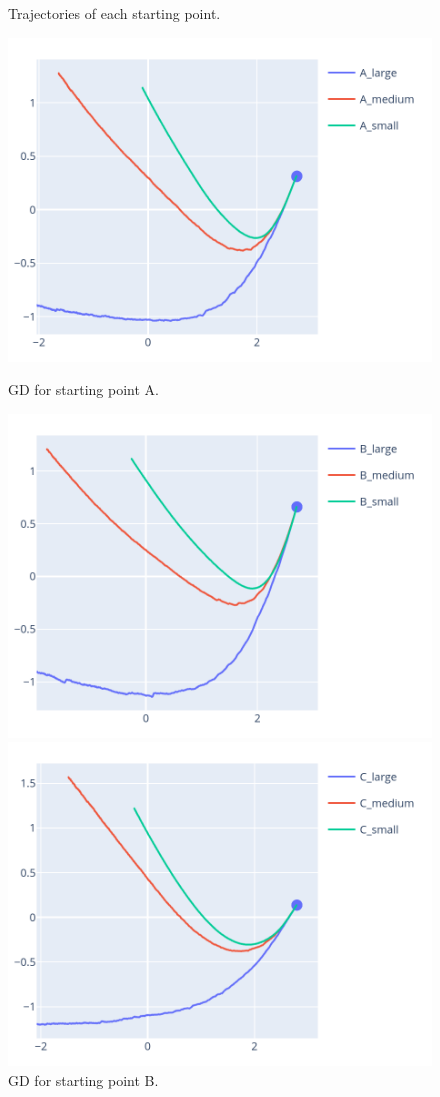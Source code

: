 \documentclass{article}
\theoremstyle{definition}
\begin{document}
\begin{figure}[!htb]
    \caption{Trajectories of each starting point.}
      \includegraphics[width=\linewidth]{trajectory_a.png}
      \caption{GD for starting point A.}
    \endminipage\hfill
      \includegraphics[width=\linewidth]{trajectory_b.png}
      \caption{GD for starting point B.}
    \endminipage\hfill
      \includegraphics[width=\linewidth]{trajectory_c.png}

\end{figure}
\end{document}

